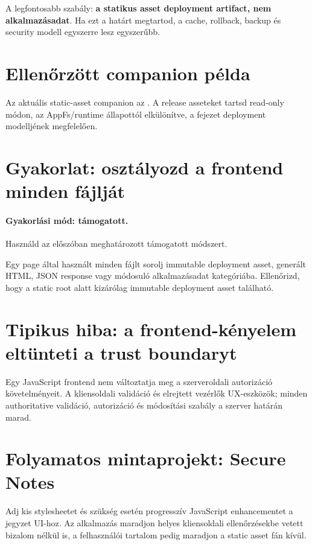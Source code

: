 A legfontosabb szabály: \textbf{a statikus asset deployment artifact, nem alkalmazásadat}. Ha ezt a határt megtartod, a cache, rollback, backup és security modell egyszerre lesz egyszerűbb.

\section{Ellenőrzött companion példa}
Az aktuális static-asset companion az . A release asseteket tartsd read-only módon, az AppFs/runtime állapottól elkülönítve, a fejezet deployment modelljének megfelelően.

\section{Gyakorlat: osztályozd a frontend minden fájlját}
\paragraph{Gyakorlási mód: támogatott.} Használd az előszóban meghatározott támogatott módszert.

Egy page által használt minden fájlt sorolj immutable deployment asset, generált HTML, JSON response vagy módosuló alkalmazásadat kategóriába. Ellenőrizd, hogy a static root alatt kizárólag immutable deployment asset található.

\section{Tipikus hiba: a frontend-kényelem eltünteti a trust boundaryt}
Egy JavaScript frontend nem változtatja meg a szerveroldali autorizáció követelményeit. A kliensoldali validáció és elrejtett vezérlők UX-eszközök; minden authoritative validáció, autorizáció és módosítási szabály a szerver határán marad.

\section{Folyamatos mintaprojekt: Secure Notes}
Adj kis stylesheetet és szükség esetén progresszív JavaScript enhancementet a jegyzet UI-hoz. Az alkalmazás maradjon helyes kliensoldali ellenőrzésekbe vetett bizalom nélkül is, a felhasználói tartalom pedig maradjon a static asset fán kívül.
